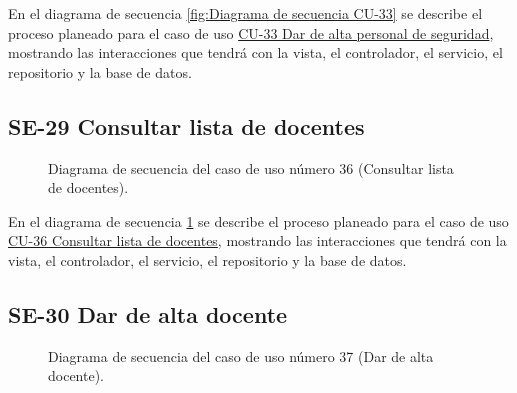 En el diagrama de secuencia \ref{fig:Diagrama de secuencia CU-33} se describe el proceso planeado para el caso de uso \hyperlink{CU-33}{CU-33 Dar de alta personal de seguridad}, mostrando las interacciones que tendrá con la vista, el controlador, el servicio, el repositorio y la base de datos.

\newpage

\subsection{SE-29 Consultar lista de docentes}

\begin{figure}[htbp!]
	\begin{center}
		\caption{Diagrama de secuencia del caso de uso número 36 (Consultar lista de docentes).}
		\label{fig:Diagrama de secuencia CU-36}
	\end{center}
\end{figure}

En el diagrama de secuencia \ref{fig:Diagrama de secuencia CU-36} se describe el proceso planeado para el caso de uso \hyperlink{CU-36}{CU-36 Consultar lista de docentes}, mostrando las interacciones que tendrá con la vista, el controlador, el servicio, el repositorio y la base de datos.

\newpage

\subsection{SE-30 Dar de alta docente}

\begin{figure}[htbp!]
	\begin{center}
		\caption{Diagrama de secuencia del caso de uso número 37 (Dar de alta docente).}
		\label{fig:Diagrama de secuencia CU-37}
	\end{center}
\end{figure}

